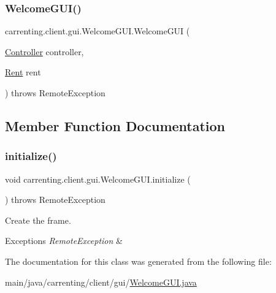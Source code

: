 \subsubsection{\texorpdfstring{WelcomeGUI()}{WelcomeGUI()}}
{\footnotesize\ttfamily carrenting.\+client.\+gui.\+Welcome\+G\+U\+I.\+Welcome\+G\+UI (\begin{DoxyParamCaption}\item[{\mbox{\hyperlink{classcarrenting_1_1client_1_1_controller}{Controller}}}]{controller,  }\item[{\mbox{\hyperlink{classcarrenting_1_1server_1_1jdo_1_1_rent}{Rent}}}]{rent }\end{DoxyParamCaption}) throws Remote\+Exception}



\subsection{Member Function Documentation}
\mbox{\label{classcarrenting_1_1client_1_1gui_1_1_welcome_g_u_i_a2bfdeb076ee5dec04b540de7b4e36a9f}} 
\subsubsection{\texorpdfstring{initialize()}{initialize()}}
{\footnotesize\ttfamily void carrenting.\+client.\+gui.\+Welcome\+G\+U\+I.\+initialize (\begin{DoxyParamCaption}{ }\end{DoxyParamCaption}) throws Remote\+Exception}

Create the frame. 
\begin{DoxyExceptions}{Exceptions}
{\em Remote\+Exception} & \\
\hline
\end{DoxyExceptions}


The documentation for this class was generated from the following file\+:\begin{DoxyCompactItemize}
\item 
main/java/carrenting/client/gui/\mbox{\hyperlink{_welcome_g_u_i_8java}{Welcome\+G\+U\+I.\+java}}\end{DoxyCompactItemize}
